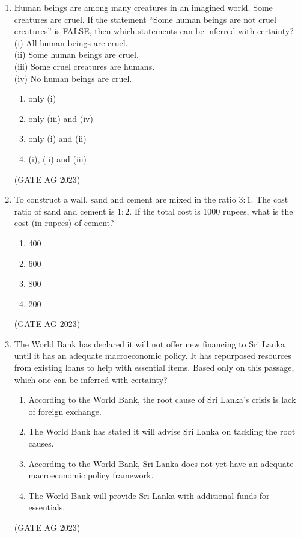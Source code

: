 \documentclass[journal,12pt,onecolumn]{IEEEtran}
\theoremstyle{remark}
\begin{document}
\begin{enumerate}
\item Human beings are among many creatures in an imagined world. Some creatures are cruel. If the statement ``Some human beings are not cruel creatures'' is FALSE, then which statements can be inferred with certainty?\\ 
(i) All human beings are cruel.\\ 
(ii) Some human beings are cruel. \\
(iii) Some cruel creatures are humans. \\
(iv) No human beings are cruel.
\begin{multicols}{2}
\begin{enumerate}
    \item only (i)
    \item only (iii) and (iv)
    \item only (i) and (ii)
    \item (i), (ii) and (iii)
\end{enumerate}
\end{multicols}
\hfill{(GATE AG 2023)}

\item To construct a wall, sand and cement are mixed in the ratio $3:1$. The cost ratio of sand and cement is $1:2$. If the total cost is 1000 rupees, what is the cost (in rupees) of cement?
\begin{multicols}{4}
\begin{enumerate}
    \item 400
    \item 600
    \item 800
    \item 200
\end{enumerate}
\end{multicols}
\hfill{(GATE AG 2023)}

\item The World Bank has declared it will not offer new financing to Sri Lanka until it has an adequate macroeconomic policy. It has repurposed resources from existing loans to help with essential items. 
Based only on this passage, which one can be inferred with certainty?
\begin{enumerate}
    \item According to the World Bank, the root cause of Sri Lanka's crisis is lack of foreign exchange.
    \item The World Bank has stated it will advise Sri Lanka on tackling the root causes.
    \item According to the World Bank, Sri Lanka does not yet have an adequate macroeconomic policy framework.
    \item The World Bank will provide Sri Lanka with additional funds for essentials.
\end{enumerate}
\hfill{(GATE AG 2023)}


\end{enumerate}
\end{document}
